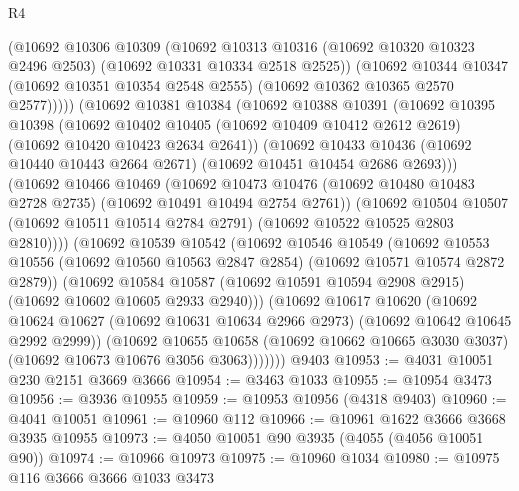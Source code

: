 \begin{lexlean}{R4}
\begin{coremodule}
            (@10692
              @10306
              @10309
              (@10692
                @10313
                @10316
                (@10692 @10320 @10323 @2496 @2503)
                (@10692 @10331 @10334 @2518 @2525))
              (@10692
                @10344
                @10347
                (@10692 @10351 @10354 @2548 @2555)
                (@10692 @10362 @10365 @2570 @2577)))))
        (@10692
          @10381
          @10384
          (@10692
            @10388
            @10391
            (@10692
              @10395
              @10398
              (@10692
                @10402
                @10405
                (@10692 @10409 @10412 @2612 @2619)
                (@10692 @10420 @10423 @2634 @2641))
              (@10692
                @10433
                @10436
                (@10692 @10440 @10443 @2664 @2671)
                (@10692 @10451 @10454 @2686 @2693)))
            (@10692
              @10466
              @10469
              (@10692
                @10473
                @10476
                (@10692 @10480 @10483 @2728 @2735)
                (@10692 @10491 @10494 @2754 @2761))
              (@10692
                @10504
                @10507
                (@10692 @10511 @10514 @2784 @2791)
                (@10692 @10522 @10525 @2803 @2810))))
          (@10692
            @10539
            @10542
            (@10692
              @10546
              @10549
              (@10692
                @10553
                @10556
                (@10692 @10560 @10563 @2847 @2854)
                (@10692 @10571 @10574 @2872 @2879))
              (@10692
                @10584
                @10587
                (@10692 @10591 @10594 @2908 @2915)
                (@10692 @10602 @10605 @2933 @2940)))
            (@10692
              @10617
              @10620
              (@10692
                @10624
                @10627
                (@10692 @10631 @10634 @2966 @2973)
                (@10692 @10642 @10645 @2992 @2999))
              (@10692
                @10655
                @10658
                (@10692 @10662 @10665 @3030 @3037)
                (@10692 @10673 @10676 @3056 @3063)))))))
    @9403
@10953 := @4031 @10051 @230 @2151 @3669 @3666
@10954 := @3463 @1033
@10955 := @10954 @3473
@10956 := @3936 @10955
@10959 := @10953 @10956 (@4318 @9403)
@10960 := @4041 @10051
@10961 := @10960 @112
@10966 := @10961 @1622 @3666 @3668 @3935 @10955
@10973 := @4050 @10051 @90 @3935 (@4055 (@4056 @10051 @90))
@10974 := @10966 @10973
@10975 := @10960 @1034
@10980 := @10975 @116 @3666 @3666 @1033 @3473

\end{coremodule}
\end{lexlean}

